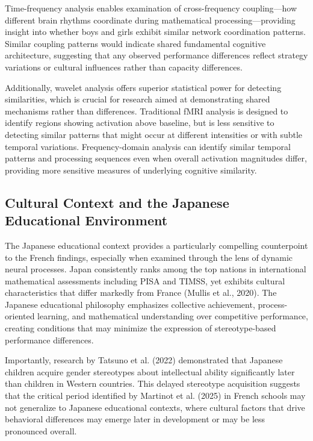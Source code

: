 \documentclass[12pt, a4paper]{article}
\begin{document}
Time-frequency analysis enables examination of cross-frequency coupling—how different brain rhythms coordinate during mathematical processing—providing insight into whether boys and girls exhibit similar network coordination patterns. Similar coupling patterns would indicate shared fundamental cognitive architecture, suggesting that any observed performance differences reflect strategy variations or cultural influences rather than capacity differences.

Additionally, wavelet analysis offers superior statistical power for detecting similarities, which is crucial for research aimed at demonstrating shared mechanisms rather than differences. Traditional fMRI analysis is designed to identify regions showing activation above baseline, but is less sensitive to detecting similar patterns that might occur at different intensities or with subtle temporal variations. Frequency-domain analysis can identify similar temporal patterns and processing sequences even when overall activation magnitudes differ, providing more sensitive measures of underlying cognitive similarity.


\subsection{Cultural Context and the Japanese Educational Environment}
The Japanese educational context provides a particularly compelling counterpoint to the French findings, especially when examined through the lens of dynamic neural processes. Japan consistently ranks among the top nations in international mathematical assessments including PISA and TIMSS, yet exhibits cultural characteristics that differ markedly from France (Mullis et al., 2020). The Japanese educational philosophy emphasizes collective achievement, process-oriented learning, and mathematical understanding over competitive performance, creating conditions that may minimize the expression of stereotype-based performance differences.

Importantly, research by Tatsuno et al. (2022) demonstrated that Japanese children acquire gender stereotypes about intellectual ability significantly later than children in Western countries. This delayed stereotype acquisition suggests that the critical period identified by Martinot et al. (2025) in French schools may not generalize to Japanese educational contexts, where cultural factors that drive behavioral differences may emerge later in development or may be less pronounced overall.
\end{document}
